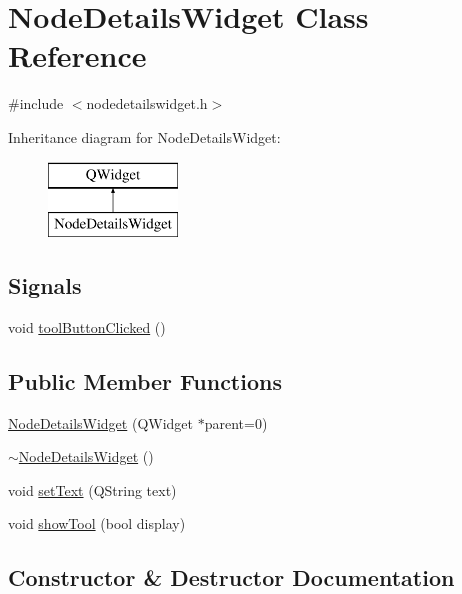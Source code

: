 \hypertarget{class_node_details_widget}{}\section{Node\+Details\+Widget Class Reference}
\label{class_node_details_widget}


{\ttfamily \#include $<$nodedetailswidget.\+h$>$}

Inheritance diagram for Node\+Details\+Widget\+:\begin{figure}[H]
\begin{center}
\leavevmode
\includegraphics[height=2.000000cm]{da/df8/class_node_details_widget}
\end{center}
\end{figure}
\subsection*{Signals}
\begin{DoxyCompactItemize}
\item 
void \mbox{\hyperlink{class_node_details_widget_abe81e19113dd9e5bc52c293a840b4866}{tool\+Button\+Clicked}} ()
\end{DoxyCompactItemize}
\subsection*{Public Member Functions}
\begin{DoxyCompactItemize}
\item 
\mbox{\hyperlink{class_node_details_widget_ac1dc8a6bd88ea5649ee44b880ce24ff0}{Node\+Details\+Widget}} (Q\+Widget $\ast$parent=0)
\item 
\mbox{\hyperlink{class_node_details_widget_ae3f0219fdac53620c182b22b6a42fdf9}{$\sim$\+Node\+Details\+Widget}} ()
\item 
void \mbox{\hyperlink{class_node_details_widget_a5ddf1c8813be4c063c18696476522c57}{set\+Text}} (Q\+String text)
\item 
void \mbox{\hyperlink{class_node_details_widget_a632457436da2a21ef902552a80f819b5}{show\+Tool}} (bool display)
\end{DoxyCompactItemize}


\subsection{Constructor \& Destructor Documentation}
\mbox{\label{class_node_details_widget_ac1dc8a6bd88ea5649ee44b880ce24ff0}} 
